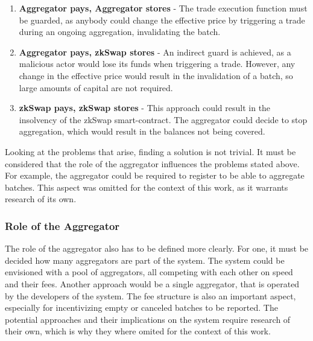 \documentclass[../../thesis.tex]{subfiles}
\begin{document}
\begin{enumerate}
    \item \textbf{Aggregator pays, Aggregator stores} - The trade execution function must be guarded, as anybody could change the effective price by triggering a trade during an ongoing aggregation, invalidating the batch. 
    \item \textbf{Aggregator pays, zkSwap stores} - An indirect guard is achieved, as a malicious actor would lose its funds when triggering a trade. However, any change in the effective price would result in the invalidation of a batch, so large amounts of capital are not required. 
    \item \textbf{zkSwap pays, zkSwap stores} - This approach could result in the insolvency of the zkSwap smart-contract. The aggregator could decide to stop aggregation, which would result in the balances not being covered. 
\end{enumerate}

Looking at the problems that arise, finding a solution is not trivial. It must be considered that the role of the aggregator influences the problems stated above. For example, the aggregator could be required to register to be able to aggregate batches. This aspect was omitted for the context of this work, as it warrants research of its own.

\subsubsection{Role of the Aggregator}
The role of the aggregator also has to be defined more clearly. For one, it must be decided how many aggregators are part of the system. The system could be envisioned with a pool of aggregators, all competing with each other on speed and their fees. Another approach would be a single aggregator, that is operated by the developers of the system. The fee structure is also an important aspect, especially for incentivizing empty or canceled batches to be reported. The potential approaches and their implications on the system require research of their own, which is why they where omited for the context of this work.
\end{document}
